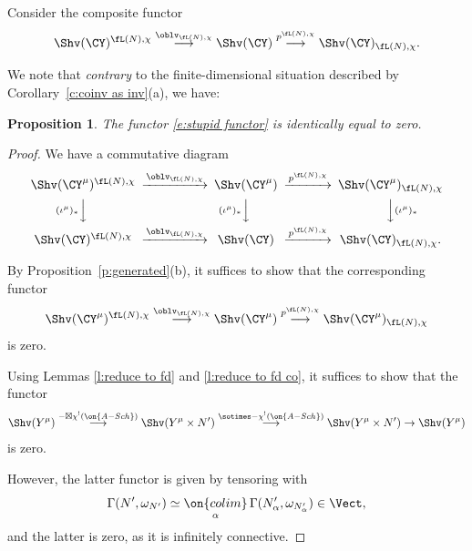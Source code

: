\documentclass[9pt]{amsart}
\newtheorem{prop}[subsubsection]{Proposition}
\theoremstyle{definition}
\theoremstyle{remark}
\newcommand{\propref}[1]{Proposition~\ref{#1}}
\newcommand{\corref}[1]{Corollary~\ref{#1}}
\numberwithin{equation}{section}
\begin{document}
\sssec{}

Consider the composite functor
\begin{equation} \label{e:stupid functor}
\Shv(\CY)^{\fL(N),\chi}\overset{\oblv_{\fL(N),\chi}}\longrightarrow 
\Shv(\CY)\overset{p^{\fL(N),\chi}}\longrightarrow  \Shv(\CY)_{\fL(N),\chi}.
\end{equation} 

We note that \emph{contrary} to the finite-dimensional situation described by \corref{c:coinv as inv}(a), we have:

\begin{prop}
The functor \eqref{e:stupid functor} is identically equal to zero.
\end{prop}

\begin{proof}

We have a commutative diagram
$$
\CD
\Shv(\CY^\mu)^{\fL(N),\chi}  @>{\oblv_{\fL(N),\chi}}>>    \Shv(\CY^\mu)  @>{p^{\fL(N),\chi}}>>
\Shv(\CY^\mu)_{\fL(N),\chi}  \\
@V{(\iota^\mu)_*}VV  @V{(\iota^\mu)_*}VV  @VV{(\iota^\mu)_*}V \\
\Shv(\CY)^{\fL(N),\chi}  @>{\oblv_{\fL(N),\chi}}>>    \Shv(\CY)  @>{p^{\fL(N),\chi}}>>
\Shv(\CY)_{\fL(N),\chi}.  \\
\endCD
$$

By \propref{p:generated}(b), it suffices to show that the corresponding functor  
\begin{equation} \label{e:stupid functor lambda}
\Shv(\CY^\mu)^{\fL(N),\chi} \overset{\oblv_{\fL(N),\chi}}\longrightarrow  \Shv(\CY^\mu)
\overset{p^{\fL(N),\chi}}\longrightarrow \Shv(\CY^\mu)_{\fL(N),\chi}
\end{equation}
is zero. 

\medskip

Using Lemmas \ref{l:reduce to fd} and \ref{l:reduce to fd co}, it suffices to show that the functor 
$$\Shv(Y^\mu) \overset{-\boxtimes \chi^!(\on{A-Sch})}\longrightarrow 
\Shv(Y^\mu\times N')  \overset{\sotimes -\chi^!(\on{A-Sch})}\longrightarrow \Shv(Y^\mu\times N')\to
\Shv(Y^\mu)$$
is zero. 

\medskip

However, the latter functor is given by tensoring with
$$\Gamma(N',\omega_{N'})\simeq \underset{\alpha}{\on{colim}}\, \Gamma(N'_\alpha,\omega_{N'_\alpha})\in \Vect,$$
and the latter is zero, as it is infinitely connective. 

\end{proof}
\end{document}

